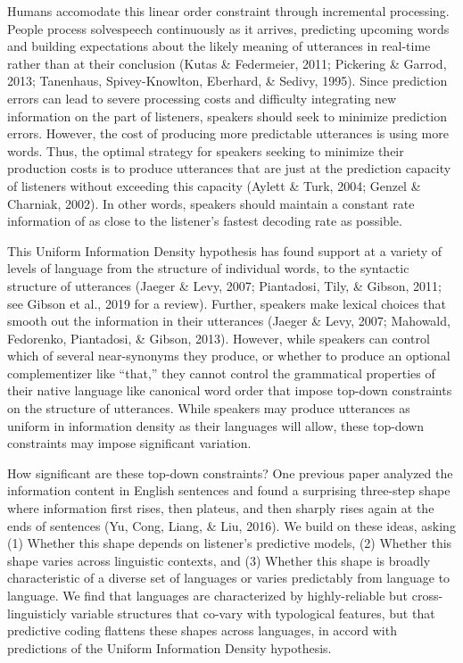 \documentclass[10pt, letterpaper]{article}
\begin{document}
Humans accomodate this linear order constraint through incremental
processing. People process solvespeech continuously as it arrives,
predicting upcoming words and building expectations about the likely
meaning of utterances in real-time rather than at their conclusion
(Kutas \& Federmeier, 2011; Pickering \& Garrod, 2013; Tanenhaus,
Spivey-Knowlton, Eberhard, \& Sedivy, 1995). Since prediction errors can
lead to severe processing costs and difficulty integrating new
information on the part of listeners, speakers should seek to minimize
prediction errors. However, the cost of producing more predictable
utterances is using more words. Thus, the optimal strategy for speakers
seeking to minimize their production costs is to produce utterances that
are just at the prediction capacity of listeners without exceeding this
capacity (Aylett \& Turk, 2004; Genzel \& Charniak, 2002). In other
words, speakers should maintain a constant rate information of as close
to the listener's fastest decoding rate as possible.

This Uniform Information Density hypothesis has found support at a
variety of levels of language from the structure of individual words, to
the syntactic structure of utterances (Jaeger \& Levy, 2007; Piantadosi,
Tily, \& Gibson, 2011; see Gibson et al., 2019 for a review). Further,
speakers make lexical choices that smooth out the information in their
utterances (Jaeger \& Levy, 2007; Mahowald, Fedorenko, Piantadosi, \&
Gibson, 2013). However, while speakers can control which of several
near-synonyms they produce, or whether to produce an optional
complementizer like ``that,'' they cannot control the grammatical
properties of their native language like canonical word order that
impose top-down constraints on the structure of utterances. While
speakers may produce utterances as uniform in information density as
their languages will allow, these top-down constraints may impose
significant variation.

How significant are these top-down constraints? One previous paper
analyzed the information content in English sentences and found a
surprising three-step shape where information first rises, then plateus,
and then sharply rises again at the ends of sentences (Yu, Cong, Liang,
\& Liu, 2016). We build on these ideas, asking (1) Whether this shape
depends on listener's predictive models, (2) Whether this shape varies
across linguistic contexts, and (3) Whether this shape is broadly
characteristic of a diverse set of languages or varies predictably from
language to language. We find that languages are characterized by
highly-reliable but cross-linguisticly variable structures that co-vary
with typological features, but that predictive coding flattens these
shapes across languages, in accord with predictions of the Uniform
Information Density hypothesis.
\end{document}
